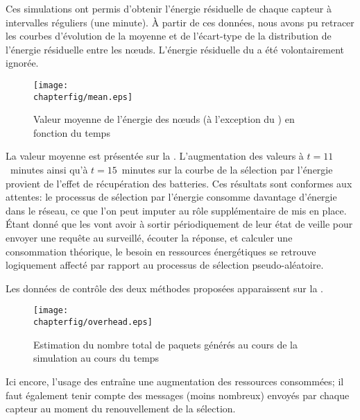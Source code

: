 Ces simulations ont permis d'obtenir l'énergie résiduelle de chaque capteur à intervalles réguliers (une minute).
À partir de ces données, nous avons pu retracer les courbes d'évolution de la moyenne et de l'écart-type de la distribution de l'énergie résiduelle entre les nœuds.
L'énergie résiduelle du \ch a été volontairement ignorée.
\begin{figure}[ht]
    \centering
    \texttt{[image: \\chapterfig/mean.eps]}
    \caption{Valeur moyenne de l'énergie des nœuds (à l'exception du \ch) en fonction du temps}\label{se:fig:mean}
\end{figure}
La valeur moyenne est présentée sur la .
L'augmentation des valeurs à $t=11$~minutes ainsi qu'à $t=15$~minutes sur la courbe de la sélection par l'énergie provient de l'effet de récupération des batteries.
Ces résultats sont conformes aux attentes: le processus de sélection par l'énergie consomme davantage d'énergie dans le réseau, ce que l'on peut imputer au rôle supplémentaire de \vn mis en place.
Étant donné que les \vns vont avoir à sortir périodiquement de leur état de veille pour envoyer une requête au \cn surveillé, écouter la réponse, et calculer une consommation théorique, le besoin en ressources énergétiques se retrouve logiquement affecté par rapport au processus de sélection pseudo-aléatoire.

Les données de contrôle des deux méthodes proposées apparaissent sur la .
\begin{figure}[ht]
    \centering
    \texttt{[image: \\chapterfig/overhead.eps]}
    \caption{Estimation du nombre total de paquets générés au cours de la simulation au cours du temps}\label{se:fig:overhead}
\end{figure}
Ici encore, l'usage des \vns entraîne une augmentation des ressources consommées; il faut également tenir compte des messages (moins nombreux) envoyés par chaque capteur au moment du renouvellement de la sélection.

